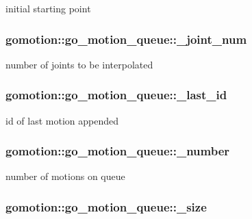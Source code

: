 initial starting point 

\hypertarget{structgomotion_1_1go__motion__queue_ab1ba219a6f370e7df6495ca0fd958108}{
\subsubsection[{\-\_\-joint\-\_\-num}]{ gomotion\-::go\-\_\-motion\-\_\-queue\-::\-\_\-joint\-\_\-num}}\label{structgomotion_1_1go__motion__queue_ab1ba219a6f370e7df6495ca0fd958108}


number of joints to be interpolated 

\hypertarget{structgomotion_1_1go__motion__queue_aeba2a7bb2b6dd7076aed9cc51904f312}{
\subsubsection[{\-\_\-last\-\_\-id}]{ gomotion\-::go\-\_\-motion\-\_\-queue\-::\-\_\-last\-\_\-id}}\label{structgomotion_1_1go__motion__queue_aeba2a7bb2b6dd7076aed9cc51904f312}


id of last motion appended 

\hypertarget{structgomotion_1_1go__motion__queue_a1c1fe7f38ef5ba8523d251d2199a19e3}{
\subsubsection[{\-\_\-number}]{ gomotion\-::go\-\_\-motion\-\_\-queue\-::\-\_\-number}}\label{structgomotion_1_1go__motion__queue_a1c1fe7f38ef5ba8523d251d2199a19e3}


number of motions on queue 

\hypertarget{structgomotion_1_1go__motion__queue_adc9cde829948ecc241cdcaa5b839c888}{
\subsubsection[{\-\_\-size}]{ gomotion\-::go\-\_\-motion\-\_\-queue\-::\-\_\-size}}\label{structgomotion_1_1go__motion__queue_adc9cde829948ecc241cdcaa5b839c888}


